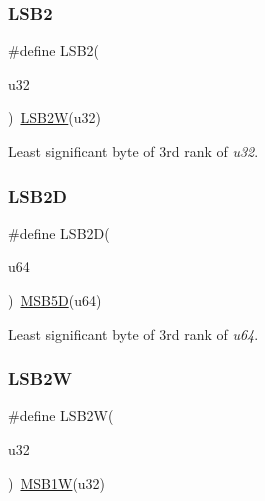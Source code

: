 \subsubsection{\texorpdfstring{LSB2}{LSB2}}
{\footnotesize\ttfamily \#define L\+S\+B2(\begin{DoxyParamCaption}\item[{}]{u32 }\end{DoxyParamCaption})~\mbox{\hyperlink{group__group__sam0__utils_gad8fda97f8caa00fcfa84f712ee7627d6}{L\+S\+B2W}}(u32)}



Least significant byte of 3rd rank of {\itshape u32}. 

\mbox{\label{group__group__sam0__utils_gaba3bea07dcc4a37039b7effd4da03b9e}} 
\subsubsection{\texorpdfstring{LSB2D}{LSB2D}}
{\footnotesize\ttfamily \#define L\+S\+B2D(\begin{DoxyParamCaption}\item[{}]{u64 }\end{DoxyParamCaption})~\mbox{\hyperlink{group__group__sam0__utils_ga5e61db58aaf5cbb3051240cdcb1b5147}{M\+S\+B5D}}(u64)}



Least significant byte of 3rd rank of {\itshape u64}. 

\mbox{\label{group__group__sam0__utils_gad8fda97f8caa00fcfa84f712ee7627d6}} 
\subsubsection{\texorpdfstring{LSB2W}{LSB2W}}
{\footnotesize\ttfamily \#define L\+S\+B2W(\begin{DoxyParamCaption}\item[{}]{u32 }\end{DoxyParamCaption})~\mbox{\hyperlink{group__group__sam0__utils_ga0f90ecd0b0f0e15608a95b8367b77ece}{M\+S\+B1W}}(u32)}



